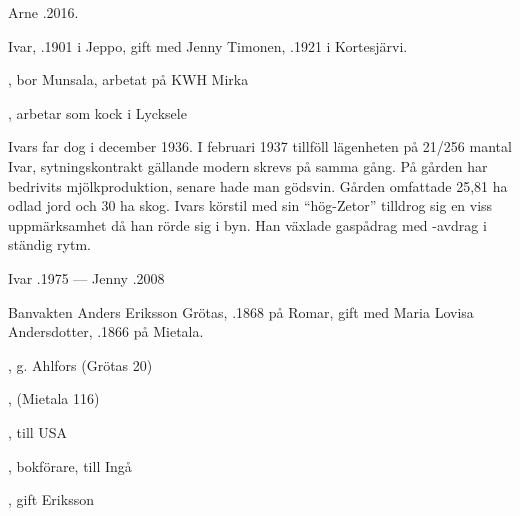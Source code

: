 Arne .2016.\jhvspace{}


%
Ivar, .1901 i Jeppo, gift med Jenny Timonen, .1921 i Kortesjärvi.
\begin{jhchildren}
  \item {}, bor Munsala, arbetat på KWH Mirka
  \item {}
  \item {}
  \item {}, arbetar som kock i Lycksele
\end{jhchildren}
Ivars far dog i december 1936. I februari 1937 tillföll lägenheten på 21/256 mantal Ivar, sytningskontrakt gällande modern skrevs på samma gång. På gården har bedrivits mjölkproduktion, senare hade man gödsvin. Gården omfattade 25,81 ha odlad jord och 30 ha skog. Ivars körstil med sin ``hög-Zetor'' tilldrog sig en viss uppmärksamhet då han rörde sig i byn. Han växlade gaspådrag med -avdrag i ständig rytm.

Ivar .1975  ---  Jenny .2008



%


%
Banvakten Anders Eriksson Grötas, .1868 på Romar, gift med Maria	Lovisa Andersdotter, .1866 på Mietala.
\begin{jhchildren}
  \item {}, g. Ahlfors (Grötas 20)
  \item {}
  \item {}, (Mietala 116)
  \item {}, till USA
  \item {}
  \item {}, bokförare, till Ingå
  \item {}, gift Eriksson
\end{jhchildren}

